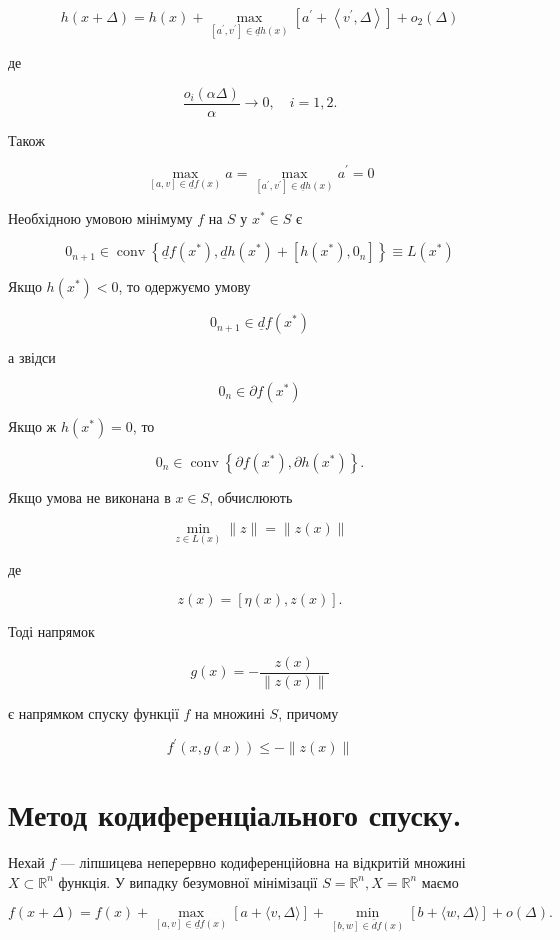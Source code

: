 \documentclass[12pt,a4paper]{extarticle}
\numberwithin{section}{part}
\begin{document}
$$
h(x+\Delta)=h(x)+\max _{\left[a^{\prime}, v^{\prime}\right] \in \underline{d} h(x)}\left[a^{\prime}+\left\langle v^{\prime}, \Delta\right\rangle\right]+o_{2}(\Delta)
$$

де

$$
\frac{o_{i}(\alpha \Delta)}{\alpha} \rightarrow 0, \quad i=1,2 .
$$

Також

$$
\max _{[a, v] \in \underline{d} f(x)} a=\max _{\left[a^{\prime}, v^{\prime}\right] \in \underline{d} h(x)} a^{\prime}=0
$$

Необхідною умовою мінімуму $f$ на $S$ у $x^{*} \in S$ є

$$
0_{n+1} \in \operatorname{conv}\left\{\underline{d} f\left(x^{*}\right), \underline{d} h\left(x^{*}\right)+\left[h\left(x^{*}\right), 0_{n}\right]\right\} \equiv L\left(x^{*}\right)
$$

Якщо $h\left(x^{*}\right)<0$, то одержуємо умову

$$
0_{n+1} \in \underline{d} f\left(x^{*}\right)
$$

а звідси

$$
0_{n} \in \partial f\left(x^{*}\right)
$$

Якщо ж $h\left(x^{*}\right)=0$, то

$$
0_{n} \in \operatorname{conv}\left\{\partial f\left(x^{*}\right), \partial h\left(x^{*}\right)\right\} .
$$

Якщо умова не виконана в $x \in S$, обчислюють

$$
\min _{z \in L(x)}\|z\|=\|z(x)\|
$$

де

$$
z(x)=[\eta(x), z(x)] .
$$

Тоді напрямок

$$
g(x)=-\frac{z(x)}{\|z(x)\|}
$$

є напрямком спуску функції $f$ на множині $S$, причому

$$
f^{\prime}(x, g(x)) \leq-\|z(x)\|
$$

\section{Метод кодиференціального спуску.}
Нехай $f$ --- ліпшицева неперервно кодиференційовна на відкритій множині $X \subset \mathbb{R}^{n}$ функція. У випадку безумовної мінімізації $S=\mathbb{R}^{n}, X=\mathbb{R}^{n}$ маємо

$$
f(x+\Delta)=f(x)+\max _{[a, v] \in \underline{d} f(x)}[a+\langle v, \Delta\rangle]+\min _{[b, w] \in \bar{d} f(x)}[b+\langle w, \Delta\rangle]+o(\Delta) .
$$
\end{document}
